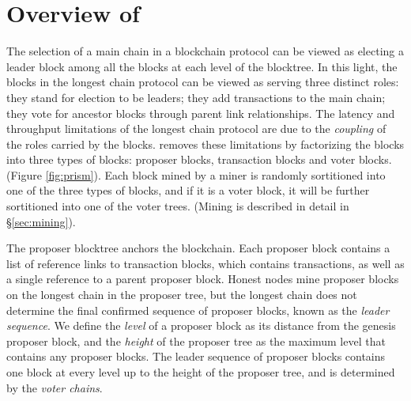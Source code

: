 
\chapter{Overview of \prism}
\label{sec:overview}


The selection of a main chain in a blockchain protocol can be viewed as electing a leader block among all the blocks at each level of the blocktree. In this light, the blocks in the longest chain protocol can be viewed as serving three distinct roles: they stand for election to be leaders;  they add transactions to the main chain; they vote for ancestor blocks through parent link relationships. The latency and throughput limitations of the longest chain protocol are due to the {\em coupling} of the roles carried by the blocks. \prism removes these limitations by factorizing the blocks into three types of blocks: proposer blocks, transaction blocks and voter blocks. (Figure \ref{fig:prism}). Each block mined by a miner is randomly sortitioned into one of the three types of blocks, and if it is a voter block, it will be further  sortitioned into one of the voter trees. (Mining is described in detail in \S\ref{sec:mining}).

The proposer blocktree anchors the \prism blockchain. 
Each proposer block contains a list of reference links to transaction blocks, which contains transactions, as well as a single reference to a parent proposer block.
Honest nodes mine proposer blocks on the longest chain in the proposer tree, but the longest chain does not determine the final confirmed sequence of proposer blocks, known as the  \emph{leader sequence}. 
We define the \emph{level} of a proposer block as its distance from the genesis proposer block, and the \emph{height} of the proposer tree as the maximum level that contains any proposer blocks. 
The leader sequence of proposer blocks contains one block at every level up to the height of the proposer tree, and is  determined by the \emph{voter chains}. 


